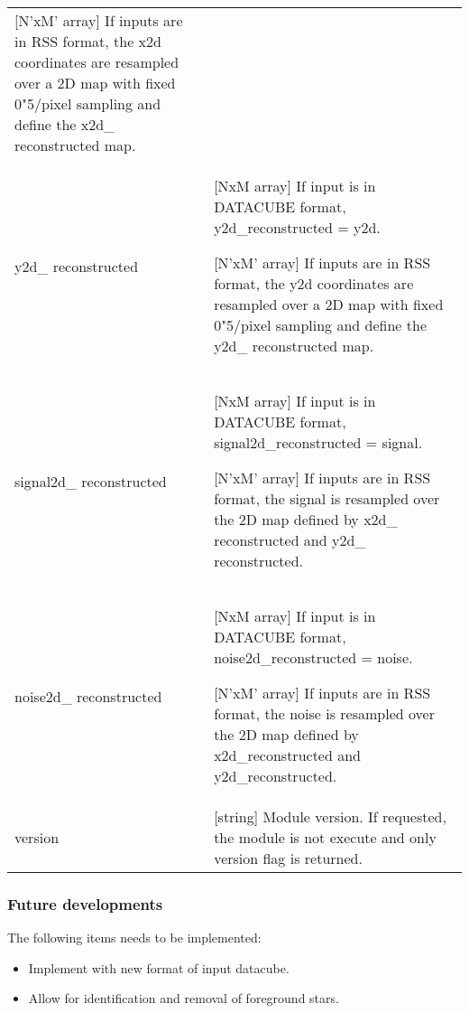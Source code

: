 \begin{center}
\begin{longtable}{p{2.7cm}| p{11.1cm}}
                          [N'xM' array] If inputs are in RSS format, the x2d coordinates are resampled over a 2D map with fixed 0"5/pixel sampling
                                     and define the  x2d\_ reconstructed map.\\
%
 y2d\_ reconstructed &    [NxM array]   If input is in DATACUBE format, y2d\_reconstructed = y2d.

                          [N'xM' array] If inputs are in RSS format, the y2d coordinates are resampled over a 2D map with fixed 0"5/pixel sampling
                                     and define the  y2d\_ reconstructed map.\\
%
 signal2d\_ reconstructed  &  [NxM array]   If input is in DATACUBE format, signal2d\_reconstructed = signal.

                         [N'xM' array] If inputs are in RSS format, the signal is resampled over the 2D map defined by
                                         x2d\_ reconstructed  and y2d\_ reconstructed. \\
%
 noise2d\_ reconstructed  &   [NxM array]   If input is in DATACUBE format, noise2d\_reconstructed = noise.

                        [N'xM' array] If inputs are in RSS format, the noise is resampled over the 2D map defined by
                                         x2d\_reconstructed  and y2d\_reconstructed. \\
%
 version   & [string]            Module version. If requested, the module is not execute and only version flag is returned.\\
%
\hline
\end{longtable}
\end{center}


\subsubsection{Future developments}

The following items needs to be implemented:

\begin{itemize}
  \item Implement with new format of input datacube.
  \item Allow for identification and removal of foreground stars.
\end{itemize}
